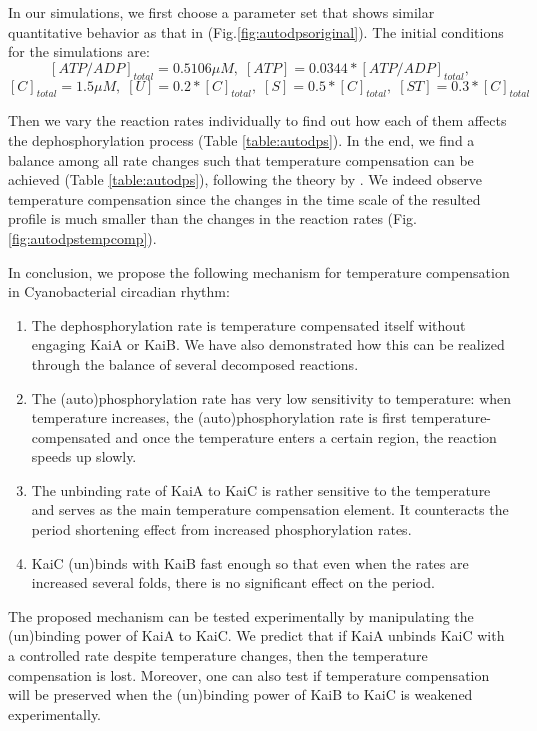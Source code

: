 \documentclass[a4paper,10pt]{article}
\numberwithin{equation}{section}
\begin{document}
In our simulations, we first choose a parameter set that shows similar quantitative behavior as that in \citet{kondo2012} (Fig.\ref{fig:autodpsoriginal}). The initial conditions for the simulations are: 
\[[ATP/ADP]_{total}= 0.5106 \mu M,\; [ATP]= 0.0344*[ATP/ADP]_{total}, \]
\[ [C]_{total}=1.5\mu M,\; [U]=0.2*[C]_{total}, \; [S]=0.5*[C]_{total}, \; [ST]=0.3*[C]_{total} \] 


Then we vary the reaction rates individually to find out how each of them affects the dephosphorylation process (Table \ref{table:autodps}).  In the end, we find a balance among all rate changes such that temperature compensation can be achieved (Table \ref{table:autodps}), following the theory by \citet{hastings1957}. We indeed observe temperature compensation since the changes in the time scale of the resulted profile is much smaller than the changes in the reaction rates (Fig.\ref{fig:autodpstempcomp}). 



In conclusion, we propose the following mechanism for temperature compensation in Cyanobacterial circadian rhythm:
\begin{enumerate}
\item The dephosphorylation rate is temperature compensated itself without engaging KaiA or KaiB. We have also demonstrated how this can be realized through the balance of several decomposed reactions.
\item The (auto)phosphorylation rate has very low sensitivity to temperature: when temperature increases, the (auto)phosphorylation rate is first temperature-compensated and once the temperature enters a certain region, the reaction speeds up slowly.
\item The unbinding rate of KaiA to KaiC is rather sensitive to the temperature and serves as the main temperature compensation element. It counteracts the period shortening effect from increased phosphorylation rates.
\item KaiC (un)binds with KaiB fast enough so that even when the rates are increased several folds, there is no significant effect on the period.
\end{enumerate}

The proposed mechanism can be tested experimentally by manipulating the (un)binding power of KaiA to KaiC. We predict that if KaiA unbinds KaiC with a controlled rate despite temperature changes, then the temperature compensation is lost. Moreover, one can also test if temperature compensation will be preserved when the (un)binding power of KaiB to KaiC is weakened experimentally. 
\end{document}
